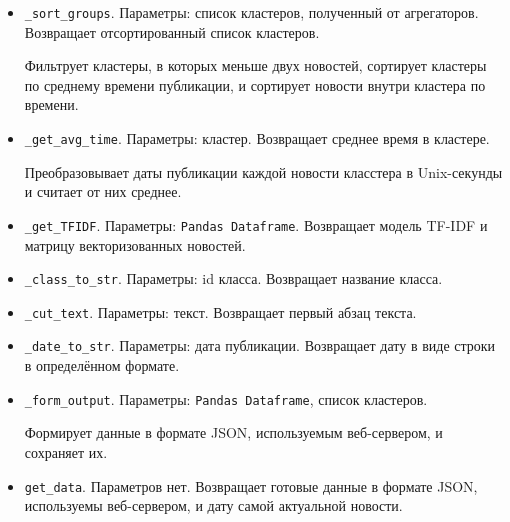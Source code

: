 \begin{itemize}
    \item \verb|_sort_groups|. Параметры: список кластеров, полученный от
    агрегаторов. Возвращает отсортированный список кластеров.

    Фильтрует кластеры, в которых меньше двух новостей, сортирует кластеры по среднему времени публикации, и сортирует новости внутри кластера по времени.

    \item \verb|_get_avg_time|. Параметры: кластер. Возвращает среднее время
    в кластере.

    Преобразовывает даты публикации каждой новости класстера в Unix-секунды и
    считает от них среднее.

    \item \verb|_get_TFIDF|. Параметры: \verb|Pandas Dataframe|.
    Возвращает модель TF-IDF и матрицу векторизованных новостей.

    \item \verb|_class_to_str|. Параметры: id класса.
    Возвращает название класса.

    \item \verb|_cut_text|. Параметры: текст.
    Возвращает первый абзац текста.

    \item \verb|_date_to_str|. Параметры: дата публикации.
    Возвращает дату в виде строки в определённом формате.

    \item \verb|_form_output|. Параметры: \verb|Pandas Dataframe|, список
    кластеров.

    Формирует данные в формате JSON, используемым веб-сервером, и сохраняет их.

    \item \verb|get_data|. Параметров нет.
    Возвращает готовые данные в формате JSON, используемы веб-сервером, и
    дату самой актуальной новости.

\end{itemize}
